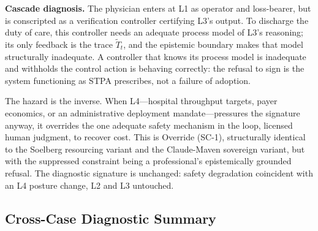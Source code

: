 \documentclass[11pt]{article}
\begin{document}
\textbf{Cascade diagnosis.} The physician enters at L1 as operator and loss-bearer, but is conscripted as a verification controller certifying L3's output. To discharge the duty of care, this controller needs an adequate process model of L3's reasoning; its only feedback is the trace $\tilde T_t$, and the epistemic boundary makes that model structurally inadequate. A controller that knows its process model is inadequate and withholds the control action is behaving correctly: the refusal to sign is the system functioning as STPA prescribes, not a failure of adoption.

The hazard is the inverse. When L4---hospital throughput targets, payer economics, or an administrative deployment mandate---pressures the signature anyway, it overrides the one adequate safety mechanism in the loop, licensed human judgment, to recover cost. This is Override (SC-1), structurally identical to the Soelberg resourcing variant and the Claude-Maven sovereign variant, but with the suppressed constraint being a professional's epistemically grounded refusal. The diagnostic signature is unchanged: safety degradation coincident with an L4 posture change, L2 and L3 untouched.

\subsection{Cross-Case Diagnostic Summary}
\end{document}
